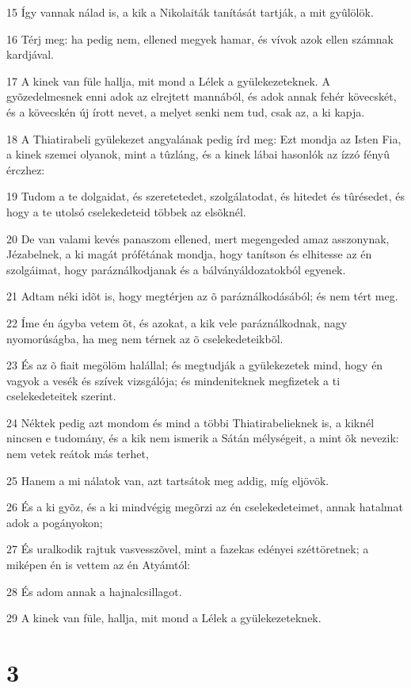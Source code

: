 \par 15 Így vannak nálad is, a kik a Nikolaiták tanítását tartják, a mit gyûlölök.
\par 16 Térj meg: ha pedig nem, ellened megyek hamar, és vívok azok ellen számnak kardjával.
\par 17 A kinek van füle hallja, mit mond a Lélek a gyülekezeteknek. A gyõzedelmesnek enni adok az elrejtett mannából, és adok annak fehér kövecskét, és a kövecskén új írott nevet, a melyet senki nem tud, csak az, a ki kapja.
\par 18 A Thiatirabeli gyülekezet angyalának pedig írd meg: Ezt mondja az Isten Fia, a kinek szemei olyanok, mint a tûzláng, és a kinek lábai hasonlók az ízzó fényû  érczhez:
\par 19 Tudom a te dolgaidat, és szeretetedet, szolgálatodat, és hitedet és tûrésedet, és hogy a te utolsó cselekedeteid többek az elsõknél.
\par 20 De van valami kevés panaszom ellened, mert megengeded amaz asszonynak, Jézabelnek,  a ki magát prófétának mondja, hogy tanítson és elhitesse az én szolgáimat, hogy paráználkodjanak és a bálványáldozatokból egyenek.
\par 21 Adtam néki idõt is, hogy megtérjen az õ paráználkodásából; és nem tért meg.
\par 22 Íme én ágyba vetem õt, és azokat, a kik vele paráználkodnak, nagy nyomorúságba, ha meg nem térnek az õ cselekedeteikbõl.
\par 23 És az õ fiait megölöm halállal; és megtudják a gyülekezetek mind, hogy én vagyok a vesék és szívek vizsgálója; és mindeniteknek megfizetek a ti cselekedeteitek  szerint.
\par 24 Néktek pedig azt mondom és mind a többi Thiatirabelieknek is, a kiknél nincsen e tudomány, és a kik nem ismerik a Sátán mélységeit, a mint õk nevezik: nem vetek reátok más terhet,
\par 25 Hanem a mi nálatok van, azt tartsátok meg addig, míg eljövök.
\par 26 És a ki gyõz, és a ki mindvégig megõrzi az én cselekedeteimet, annak hatalmat adok a pogányokon;
\par 27 És uralkodik rajtuk vasvesszõvel, mint a fazekas edényei széttöretnek; a miképen én is vettem az én Atyámtól:
\par 28 És adom annak a hajnalcsillagot.
\par 29 A kinek van füle, hallja, mit mond a Lélek a gyülekezeteknek.

\chapter{3}

